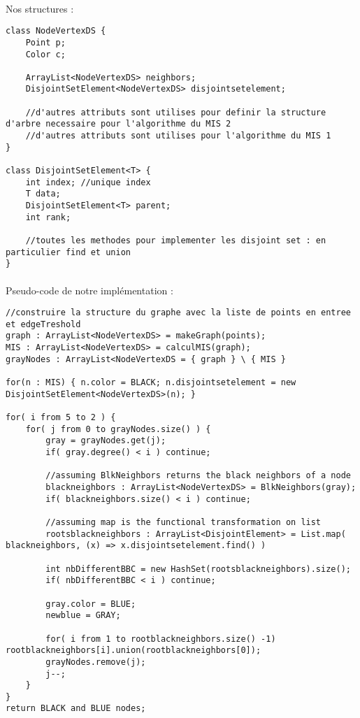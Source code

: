 \paragraph{}
Nos structures :
\begin{lstlisting}
class NodeVertexDS {
	Point p;
	Color c;
	
	ArrayList<NodeVertexDS> neighbors;
	DisjointSetElement<NodeVertexDS> disjointsetelement;
	
	//d'autres attributs sont utilises pour definir la structure d'arbre necessaire pour l'algorithme du MIS 2
	//d'autres attributs sont utilises pour l'algorithme du MIS 1
}

class DisjointSetElement<T> {
	int index; //unique index
	T data;
	DisjointSetElement<T> parent;
	int rank;
	
	//toutes les methodes pour implementer les disjoint set : en particulier find et union
}
\end{lstlisting}

\paragraph{}
Pseudo-code de notre implémentation :

\begin{lstlisting}
//construire la structure du graphe avec la liste de points en entree et edgeTreshold
graph : ArrayList<NodeVertexDS> = makeGraph(points);
MIS : ArrayList<NodeVertexDS> = calculMIS(graph);
grayNodes : ArrayList<NodeVertexDS = { graph } \ { MIS }

for(n : MIS) { n.color = BLACK; n.disjointsetelement = new DisjointSetElement<NodeVertexDS>(n); }

for( i from 5 to 2 ) {
	for( j from 0 to grayNodes.size() ) {
		gray = grayNodes.get(j);
		if( gray.degree() < i ) continue;
		
		//assuming BlkNeighbors returns the black neighbors of a node
		blackneighbors : ArrayList<NodeVertexDS> = BlkNeighbors(gray);
		if( blackneighbors.size() < i ) continue;
		
		//assuming map is the functional transformation on list
		rootsblackneighbors : ArrayList<DisjointElement> = List.map( blackneighbors, (x) => x.disjointsetelement.find() )
			
		int nbDifferentBBC = new HashSet(rootsblackneighbors).size();
		if( nbDifferentBBC < i ) continue;
			
		gray.color = BLUE;
		newblue = GRAY;
			
		for( i from 1 to rootblackneighbors.size() -1) rootblackneighbors[i].union(rootblackneighbors[0]);
		grayNodes.remove(j);
		j--;
	}
}
return BLACK and BLUE nodes;
\end{lstlisting}


